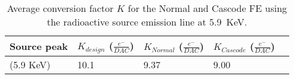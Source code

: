\begin{table}[h!]
\centering
\begin{tabular}{C{2.8cm}|C{1.7cm}|C{1.8cm}|C{1.7cm}|C{1.7cm}}
\hline
Source peak & $K_{design}$ ($\frac{e^{-}}{DAC}$) & $K_{Normal}$ ($\frac{e^{-}}{DAC}$) & $K_{Cascode}$ ($\frac{e^{-}}{DAC}$)\\[2.5ex]
\hline
\hline
{} (5.9 KeV) & 10.1  & 9.37 & 9.00\\[1ex]
\hline
\hline
\end{tabular}
\caption{Average conversion factor $K$ for the Normal and Cascode FE using the  radioactive source emission line at \SI{5.9}{KeV}.}
\label{tab:cap_mean}
\end{table}

\begin{comment}
\begin{figure}
\centering
\subfigure[\textbf{Normal}]
{\texttt{[image: k\_maps\_Normal]}}\quad
\subfigure[\textbf{Cascode}]
{\texttt{[image: k\_maps\_Cascode]}}\\
\subfigure[\textbf{All}]
{\texttt{[image: k\_maps]}}\\
\caption{???}
\label{fig:k_map}
\end{figure} 
\end{comment}







